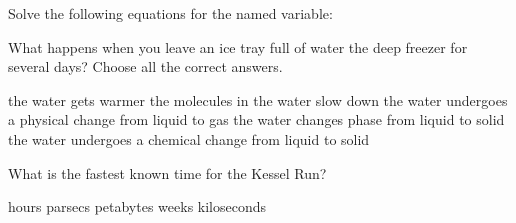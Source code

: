 \documentclass[11pt,addpoints]{exam}   	%
\begin{document}
\begin{questions}
\vspace{.2in}

\question Solve the following equations for the named variable:
\pagebreak

\question[5] What happens when you leave an ice tray full of water the deep freezer for several days?
Choose all the correct answers.

\begin{choices}
\choice the water gets warmer
\choice the molecules in the water slow down
\choice the water undergoes a physical change from liquid to gas
\choice the water changes phase from liquid to solid
\choice the water undergoes a chemical change from liquid to solid
\end{choices}
\vspace{.2in}

\question[1] What is the fastest known time for the Kessel Run?
\begin{choices}
 hours
 parsecs
 petabytes
 weeks
 kiloseconds
\end{choices}
\vspace{.2in}


\end{questions}
\end{document}
